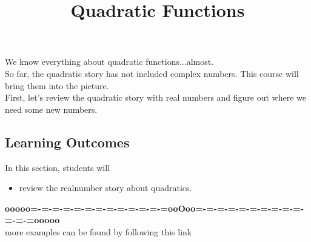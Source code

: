 \documentclass{ximera}
\title{Quadratic Functions}
\begin{document}
\begin{abstract}
\end{abstract}
\maketitle



We know everything about quadratic functions...almost. \\

So far, the quadratic story has not included complex numbers.  This course will bring them into the picture. \\



First, let's review the quadratic story with real numbers and figure out where we need some new numbers.













\subsection{Learning Outcomes}

\begin{sectionOutcomes}
In this section, students will 

\begin{itemize}
\item review the realnumber story about quadratics.
\end{itemize}
\end{sectionOutcomes}










\begin{center}
\textbf{\textcolor{green!50!black}{ooooo=-=-=-=-=-=-=-=-=-=-=-=-=ooOoo=-=-=-=-=-=-=-=-=-=-=-=-=ooooo}} \\

more examples can be found by following this link\\ 

\end{center}
\end{document}
